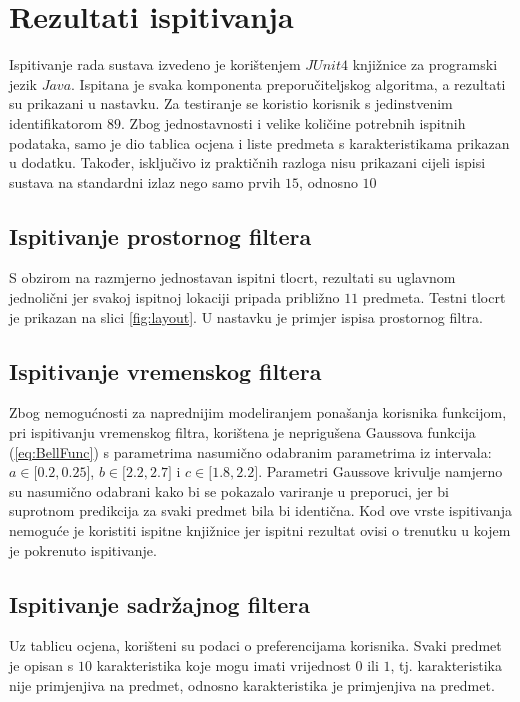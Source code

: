 \documentclass[times, utf8, diplomski, numeric]{fer}
\begin{document}
\section{Rezultati ispitivanja}
Ispitivanje rada sustava izvedeno je korištenjem $JUnit 4$ knjižnice za
programski jezik $Java$. Ispitana je svaka komponenta preporučiteljskog
algoritma, a rezultati su prikazani u nastavku.  Za testiranje se koristio
korisnik s jedinstvenim identifikatorom $89$.
Zbog jednostavnosti i velike količine potrebnih ispitnih podataka, samo je dio
tablica ocjena i liste predmeta s karakteristikama prikazan u dodatku. Također,
isključivo iz praktičnih razloga nisu prikazani cijeli ispisi sustava na
standardni izlaz nego samo prvih $15$, odnosno $10$

\subsection{Ispitivanje prostornog filtera}
S obzirom na razmjerno jednostavan ispitni tlocrt, rezultati su uglavnom
jednolični jer svakoj ispitnoj lokaciji pripada približno $11$ predmeta. Testni
tlocrt je prikazan na slici \ref{fig:layout}. U nastavku je primjer ispisa
prostornog filtra.



\subsection{Ispitivanje vremenskog filtera}
Zbog nemogućnosti za naprednijim modeliranjem ponašanja korisnika funkcijom, pri
ispitivanju vremenskog filtra, korištena je neprigušena Gaussova funkcija
(\ref{eq:BellFunc}) s parametrima nasumično odabranim parametrima iz intervala:
$a \in \big[0.2, 0.25 \big]$, 
$b \in \big[2.2, 2.7 \big]$ i 
$c \in \big[1.8, 2.2 \big]$.
Parametri Gaussove krivulje namjerno su nasumično odabrani kako bi se pokazalo
variranje u preporuci, jer bi suprotnom predikcija za svaki predmet bila bi
identična. Kod ove vrste ispitivanja nemoguće je koristiti ispitne knjižnice
jer ispitni rezultat ovisi o trenutku u kojem je pokrenuto ispitivanje.



\subsection{Ispitivanje sadržajnog filtera}
Uz tablicu ocjena, korišteni su podaci o preferencijama korisnika. Svaki predmet
je opisan s $10$ karakteristika koje mogu imati vrijednost $0$ ili $1$, tj.
karakteristika nije primjenjiva na predmet, odnosno karakteristika je
primjenjiva na predmet.
\end{document}
